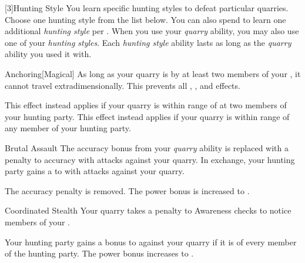         [3]{Hunting Style}
        You learn specific hunting styles to defeat particular quarries.
        Choose one hunting style from the list below.
        You can also spend  to learn one additional \textit{hunting style} per .
        When you use your \textit{quarry} ability, you may also use one of your \textit{hunting styles}.
        Each \textit{hunting style} ability lasts as long as the \textit{quarry} ability you used it with.
        {
            \begin{freeability}{Anchoring}[Magical]
                As long as your quarry is  by at least two members of your , it cannot travel extradimensionally.
                This prevents all , , and  effects.

                \rankline
                 This effect instead applies if your quarry is within \rngmed range of at two members of your hunting party.
                 This effect instead applies if your quarry is within \rnglong range of any member of your hunting party.
            \end{freeability}

            \begin{freeability}{Brutal Assault}
                The accuracy bonus from your \textit{quarry} ability is replaced with a  penalty to accuracy with  attacks against your quarry.
                In exchange, your hunting party gains a   to  with  attacks against your quarry.

                \rankline
                 The accuracy penalty is removed.
                 The power bonus is increased to .
            \end{freeability}

            \begin{freeability}{Coordinated Stealth}
                Your quarry takes a  penalty to Awareness checks to notice members of your .

                \rankline
                 Your hunting party gains a  bonus to  against your quarry if it is \unaware of every member of the hunting party.
                 The power bonus increases to .
            \end{freeability}

}
